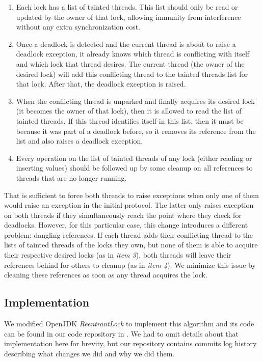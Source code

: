 \begin{enumerate}
\item Each lock has a list of tainted threads. This list should only be read or updated by the owner of that lock, allowing immunity from interference without any extra synchronization cost.
\item Once a deadlock is detected and the current thread is about to raise a deadlock exception, it already knows which thread is conflicting with itself and which lock that thread desires. The current thread (the owner of the desired lock) will add this conflicting thread to the tainted threads list for that lock. After that, the deadlock exception is raised.
\item When the conflicting thread is unparked and finally acquires its desired lock (it becomes the owner of that lock), then it is allowed to read the list of tainted threads. If this thread identifies itself in this list, then it must be because it was part of a deadlock before, so it removes its reference from the list and also raises a deadlock exception.
\item Every operation on the list of tainted threads of any lock (either reading or inserting values) should be followed up by some cleanup on all references to threads that are no longer running.
\end{enumerate}

That is sufficient to force both threads to raise exceptions when only one of them would raise an exception in the initial protocol. The latter only raises exception on both threads if they simultaneously reach the point where they check for deadlocks. However, for this particular case, this change introduces a different problem: dangling references.
If each thread adds their conflicting thread to the lists of tainted threads of the locks they own, 
but none of them is able to acquire their respective desired locks (as in \emph{item 3}),
both threads will leave their references behind for others to cleanup (as in \emph{item 4}).
We minimize this issue by cleaning these references as soon as any thread acquires the lock.

\subsection{Implementation}

We modified OpenJDK \emph{ReentrantLock} to implement this algorithm and its code can be found in our code repository in \cite{repo}. We had to omit details about that implementation here for brevity, but our repository contains commits log history describing what changes we did and why we did them.




